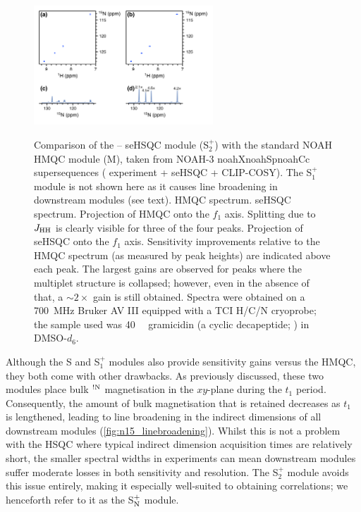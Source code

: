 \documentclass[11pt]{article}
\newcommand*{\noahthree}[3]{\csname noah#1\endcsname\csname noah#2\endcsname\csname noah#3\endcsname}
\newcommand*{\noahM}{M}
\newcommand*{\noahS}{S}
\newcommand*{\noahSpa}{S$^+_1$}
\newcommand*{\noahSpb}{S$^+_2$}
\newcommand*{\noahSpn}{S$\rm ^+_N$}
\newcommand*{\carbon}{\ce{^{13}C}}
\newcommand*{\proton}{\ce{^{1}H}}
\newcommand*{\nitrogen}{\ce{^{15}N}}
\newcommand*{\magnnot}[1]{\ce{^1H}$^{!#1}$}
\newcommand*{\jhh}{J_{\ce{HH}}}
\begin{document}
\begin{refsection}
\begin{figure}
    \centering
    \includegraphics[width=0.6\textwidth]{15n_spv2vsm.png}
    {\label{fig:15n_spv2vsm_hmqc}}
    {\label{fig:15n_spv2vsm_spv2}}
    {\label{fig:15n_spv2vsm_hmqc_proj}}
    {\label{fig:15n_spv2vsm_spv2_proj}}
    \caption{
        Comparison of the \proton{}--\nitrogen{} seHSQC module (\noahSpb{}) with the standard NOAH HMQC module (\noahM{}), taken from NOAH-3 \noahthree{X}{Sp}{Cc} supersequences (\nitrogen{} experiment + \carbon{} seHSQC + CLIP-COSY).
        The \noahSpa{} module is not shown here as it causes line broadening in downstream modules (see text).
        \textbf{} \nitrogen{} HMQC spectrum.
        \textbf{} \nitrogen{} seHSQC spectrum.
        \textbf{} Projection of HMQC onto the $f_1$ axis.
        Splitting due to $\jhh$ is clearly visible for three of the four peaks.
        \textbf{} Projection of seHSQC onto the $f_1$ axis.
        Sensitivity improvements relative to the HMQC spectrum (as measured by peak heights) are indicated above each peak.
        The largest gains are observed for peaks where the multiplet structure is collapsed; however, even in the absence of that, a $\sim 2\times$ gain is still obtained.
        Spectra were obtained on a \SI{700}{\MHz} Bruker AV III equipped with a TCI H/C/N cryoprobe; the sample used was \SI{40}{\milli\molar} gramicidin (a cyclic decapeptide; ) in DMSO-$d_6$.
    }
    \label{fig:15n_spv2vsm}
\end{figure}

Although the \noahS{} and \noahSpa{} modules also provide sensitivity gains versus the HMQC, they both come with other drawbacks.
As previously discussed, these two modules place bulk \magnnot{\ce{N}} magnetisation in the $xy$-plane during the $t_1$ period.
Consequently, the amount of bulk magnetisation that is retained decreases as $t_1$ is lengthened, leading to line broadening in the indirect dimensions of all downstream modules (\cref{fig:n15_linebroadening}).
Whilst this is not a problem with the \carbon{} HSQC where typical \carbon{} indirect dimension acquisition times are relatively short, the smaller spectral widths in \nitrogen{} experiments can mean downstream modules suffer moderate losses in both sensitivity and resolution.
The \noahSpb{} module avoids this issue entirely, making it especially well-suited to obtaining \nitrogen{} correlations; we henceforth refer to it as the \noahSpn{} module.


\end{refsection}
\end{document}
